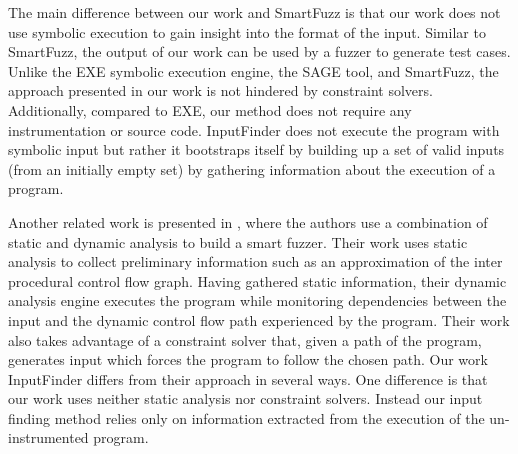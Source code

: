 \documentclass{sig-alternate-05-2015}
\def \tool {InputFinder}
\begin{document}
The main difference between our work and SmartFuzz is that our work does not use symbolic execution to gain insight into the format of the input.
Similar to SmartFuzz, the output of our work can be used by a fuzzer to generate test cases.
Unlike the EXE symbolic execution engine, the SAGE tool, and SmartFuzz, the approach presented in our work is not hindered by constraint solvers.
Additionally, compared to EXE, our method does not require any instrumentation or source code.
\tool{} does not execute the program with symbolic input but rather it bootstraps itself by building up a set of valid inputs (from an initially empty set) by gathering information about the execution of a program.

Another related work is presented in \cite{smartfuzzer}, where the authors use a combination of static and dynamic analysis to build a smart fuzzer.
Their work uses static analysis to collect preliminary information such as an approximation of the inter procedural control flow graph.
Having gathered static information, their dynamic analysis engine executes the program while monitoring dependencies between the input and the dynamic control flow path experienced by the program.
Their work also takes advantage of a constraint solver that, given a path of the program, generates input which forces the program to follow the chosen path.
Our work \tool{} differs from their approach in several ways.
One difference is that our work uses neither static analysis nor constraint solvers.
Instead our input finding method relies only on information extracted from the execution of the un-instrumented program. 

\end{document}
